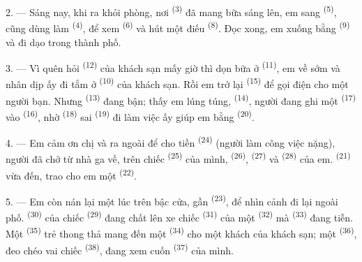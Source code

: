 2. --- Sáng nay, khi ra khỏi phòng, nơi 
\textsuperscript{(3)} đã mang bữa sáng lên, em sang 
\textsuperscript{(5)}, cũng dùng làm  \textsuperscript{(4)}, để xem
 \textsuperscript{(6)} và hút một điếu 
\textsuperscript{(8)}. Đọc xong, em xuống bằng 
\textsuperscript{(9)} và đi dạo trong thành phố.

3. --- Vì quên hỏi  \textsuperscript{(12)} của khách sạn mấy giờ
thì dọn bữa ở  \textsuperscript{(11)}, em về sớm và nhân dịp ấy đi
tắm ở  \textsuperscript{(10)} của khách sạn. Rồi em trở lại
 \textsuperscript{(15)} để gọi điện cho một người bạn. Nhưng  \textsuperscript{(13)} đang bận; thấy em lúng túng, 
\textsuperscript{(14)}, người đang ghi một  \textsuperscript{(17)} vào
 \textsuperscript{(16)}, nhờ 
\textsuperscript{(18)} sai  \textsuperscript{(19)} đi làm việc ấy giúp em
bằng  \textsuperscript{(20)}.

4. --- Em cảm ơn chị và ra ngoài để cho tiền 
\textsuperscript{(24)} (người làm công việc nặng), người đã chở từ nhà ga về, trên chiếc
 \textsuperscript{(25)} của mình, 
\textsuperscript{(26)},  \textsuperscript{(27)} và 
\textsuperscript{(28)} của em.  \textsuperscript{(21)} vừa đến,
trao cho em một  \textsuperscript{(22)}.

5. --- Em còn nán lại một lúc trên bậc cửa, gần 
\textsuperscript{(23)}, để nhìn cảnh đi lại ngoài phố. 
\textsuperscript{(30)} của chiếc  \textsuperscript{(29)} đang
chất lên xe chiếc  \textsuperscript{(31)} của một 
\textsuperscript{(32)} mà  \textsuperscript{(33)} đang tiễn.
Một  \textsuperscript{(35)} trẻ thong thả mang đến một
 \textsuperscript{(34)} cho một khách của khách sạn; một  \textsuperscript{(36)}, đeo chéo vai chiếc 
\textsuperscript{(38)}, đang xem cuốn  \textsuperscript{(37)} của
mình.

\VUsaut{4.0mm}
\VUsaut{3.0mm}

